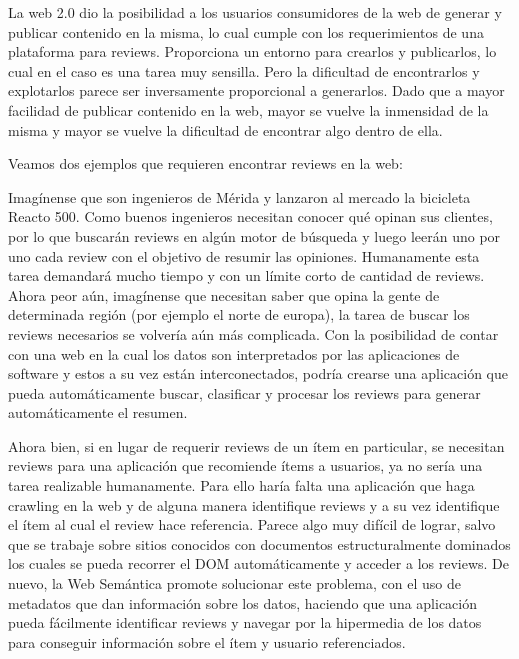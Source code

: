 La web 2.0 dio la posibilidad a los usuarios consumidores de la web de generar y publicar contenido en la misma, lo cual cumple con los requerimientos de una plataforma para reviews. Proporciona un entorno para crearlos y publicarlos, lo cual en el caso es una tarea muy sensilla. 
Pero la dificultad de encontrarlos y explotarlos parece ser inversamente proporcional a generarlos. Dado que a mayor facilidad de publicar contenido en la web, mayor se vuelve la inmensidad de la misma y mayor se vuelve la dificultad de encontrar algo dentro de ella.

Veamos dos ejemplos que requieren encontrar reviews en la web:

Imagínense que son ingenieros de Mérida y lanzaron al mercado la bicicleta Reacto 500. Como buenos ingenieros necesitan conocer qué opinan sus clientes, por lo que buscarán reviews en algún motor de búsqueda y luego leerán uno por uno cada review con el objetivo de resumir las opiniones. Humanamente esta tarea demandará mucho tiempo y con un límite corto de cantidad de reviews. 
Ahora peor aún, imagínense que necesitan saber que opina la gente de determinada región (por ejemplo el norte de europa), la tarea de buscar los reviews necesarios se volvería aún más complicada.
Con la posibilidad de contar con una web en la cual los datos son interpretados por las aplicaciones de software y estos a su vez están interconectados, podría crearse una aplicación que pueda automáticamente buscar, clasificar y procesar los reviews para generar automáticamente el resumen.

Ahora bien, si en lugar de requerir reviews de un ítem en particular, se necesitan reviews para una aplicación que recomiende ítems a usuarios, ya no sería una tarea realizable humanamente. Para ello haría falta una aplicación que haga crawling en la web y de alguna manera identifique reviews y a su vez identifique el ítem al cual el review hace referencia. 
Parece algo muy difícil de lograr, salvo que se trabaje sobre sitios conocidos con documentos estructuralmente dominados los cuales se pueda recorrer el DOM automáticamente y acceder a los reviews.
De nuevo, la Web Semántica promote solucionar este problema, con el uso de metadatos que dan información sobre los datos, haciendo que una aplicación pueda fácilmente identificar reviews y navegar por la hipermedia de los datos para conseguir información sobre el ítem y usuario referenciados.

